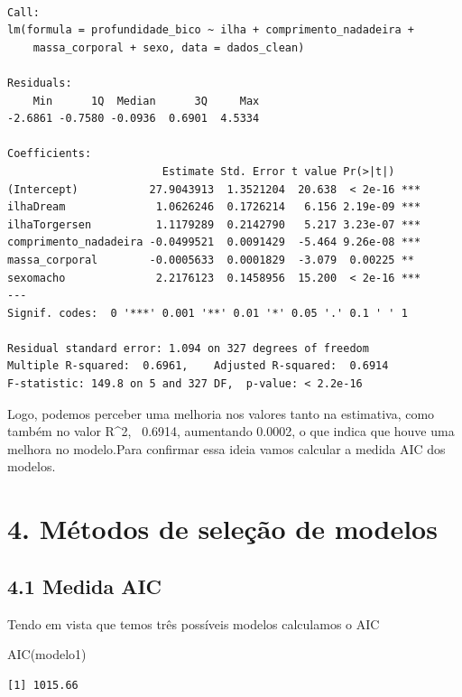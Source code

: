 \documentclass[
  letterpaper,
  DIV=11,
  numbers=noendperiod]{scrartcl}
\newenvironment{Shaded}{\begin{snugshade}}{\end{snugshade}}
\newcommand{\FunctionTok}[1]{\textcolor[rgb]{0.28,0.35,0.67}{#1}}
\newcommand{\NormalTok}[1]{\textcolor[rgb]{0.00,0.23,0.31}{#1}}
\begin{document}
\begin{verbatim}

Call:
lm(formula = profundidade_bico ~ ilha + comprimento_nadadeira + 
    massa_corporal + sexo, data = dados_clean)

Residuals:
    Min      1Q  Median      3Q     Max 
-2.6861 -0.7580 -0.0936  0.6901  4.5334 

Coefficients:
                        Estimate Std. Error t value Pr(>|t|)    
(Intercept)           27.9043913  1.3521204  20.638  < 2e-16 ***
ilhaDream              1.0626246  0.1726214   6.156 2.19e-09 ***
ilhaTorgersen          1.1179289  0.2142790   5.217 3.23e-07 ***
comprimento_nadadeira -0.0499521  0.0091429  -5.464 9.26e-08 ***
massa_corporal        -0.0005633  0.0001829  -3.079  0.00225 ** 
sexomacho              2.2176123  0.1458956  15.200  < 2e-16 ***
---
Signif. codes:  0 '***' 0.001 '**' 0.01 '*' 0.05 '.' 0.1 ' ' 1

Residual standard error: 1.094 on 327 degrees of freedom
Multiple R-squared:  0.6961,    Adjusted R-squared:  0.6914 
F-statistic: 149.8 on 5 and 327 DF,  p-value: < 2.2e-16
\end{verbatim}

Logo, podemos perceber uma melhoria nos valores tanto na estimativa,
como também no valor R\^{}2,~ 0.6914, aumentando 0.0002, o que indica
que houve uma melhora no modelo.Para confirmar essa ideia vamos calcular
a medida AIC dos modelos.

\section{4. Métodos de seleção de
modelos}\label{muxe9todos-de-seleuxe7uxe3o-de-modelos}

\subsection{4.1 Medida AIC}\label{medida-aic}

Tendo em vista que temos três possíveis modelos calculamos o AIC

\begin{Shaded}
\begin{Highlighting}[]
\FunctionTok{AIC}\NormalTok{(modelo1)}
\end{Highlighting}
\end{Shaded}

\begin{verbatim}
[1] 1015.66
\end{verbatim}
\end{document}
